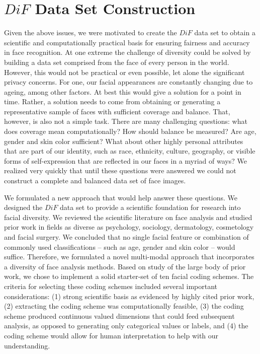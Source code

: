 \documentclass[letterpaper,11pt]{article}
\begin{document}

\section{$DiF$ Data Set Construction}  \label{sec:data set}

Given the above issues, we were motivated to create the $DiF$ data set to obtain a scientific and computationally practical basis for ensuring fairness and accuracy in face recognition.  At one extreme the challenge of diversity could be solved by building a data set comprised from the face of every person in the world.  However, this would not be practical or even possible, let alone the significant privacy concerns.  For one, our facial appearances are constantly changing due to ageing, among other factors.  At best this would give a solution for a point in time.  Rather, a solution needs to come from obtaining or generating a representative sample of faces with sufficient coverage and balance.  That, however, is also not a simple task.  There are many challenging questions: what does coverage mean computationally?  How should balance be measured?  Are age, gender and skin color sufficient?  What about other highly personal attributes that are part of our identity, such as race, ethnicity, culture, geography, or visible forms of self-expression that are reflected in our faces in a myriad of ways?  We realized very quickly that until these questions were answered we could not construct a complete and balanced data set of face images.

We formulated a new approach that would help answer these questions.  We designed the $DiF$ data set to provide a scientific foundation for research into facial diversity.  We reviewed the scientific literature on face analysis and studied prior work in fields as diverse as psychology, sociology, dermatology, cosmetology and facial surgery.  We concluded that no single facial feature or combination of commonly used classifications -- such as age, gender and skin color -- would suffice.  Therefore, we formulated a novel multi-modal approach that incorporates a diversity of face analysis methods.  Based on study of the large body of prior work, we chose to implement a solid starter-set of ten facial coding schemes.  The criteria for selecting these coding schemes included several important considerations: (1) strong scientific basis as evidenced by highly cited prior work, (2) extracting the coding scheme was computationally feasible, (3) the coding scheme produced continuous valued dimensions that could feed subsequent analysis, as opposed to generating only categorical values or labels, and (4) the coding scheme would allow for human interpretation to help with our understanding.
\end{document}
